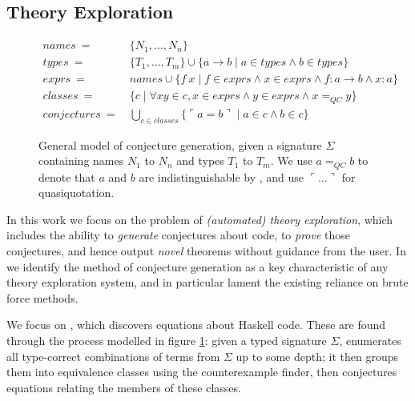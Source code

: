 \subsection{Theory Exploration}
\label{theoryexploration}

\begin{figure}
  \begin{equation*}
    \begin{split}
      names\       =\ & \{ N_1, \dots, N_n \}                                                                  \\
      types\       =\ & \{ T_1, \dots, T_m \} \cup \{a \rightarrow b \mid a \in types \wedge b \in types \} \\
      exprs\       =\ & names \cup \{ f\ x \mid f \in exprs \wedge x \in exprs \wedge f : a \rightarrow b \wedge x : a \} \\
      classes\     =\ & \{c \mid \forall x y \in c, x \in exprs \wedge y \in exprs \wedge x =_{QC} y \} \\
      conjectures\ =\ & \bigcup_{c \in classes}\{ \ulcorner a = b \urcorner \mid a \in c \wedge b \in c \}
    \end{split}
  \end{equation*}

  \caption{General model of \qspec{} conjecture generation, given a signature $\Sigma$ containing names $N_1$ to $N_n$ and types $T_1$ to $T_m$. We use $a =_{QC} b$ to denote that $a$ and $b$ are indistinguishable by \qcheck{}, and use $\ulcorner \dots \urcorner$ for quasiquotation.}
  \label{qspecmodel}
\end{figure}

In this work we focus on the problem of \emph{(automated) theory exploration}, which includes the ability to \emph{generate} conjectures about code, to \emph{prove} those conjectures, and hence output \emph{novel} theorems without guidance from the user. In \citep{warburtonscaling} we identify the method of conjecture generation as a key characteristic of any theory exploration system, and in particular lament the existing reliance on brute force methods.

We focus on \qspec{} \citep{QuickSpec}, which discovers equations about Haskell code. These are found through the process modelled in figure \ref{qspecmodel}: given a typed signature $\Sigma$, \qspec{} enumerates all type-correct combinations of terms from $\Sigma$ up to some depth; it then groups them into equivalence classes using the \qcheck{} counterexample finder, then conjectures equations relating the members of these classes.

